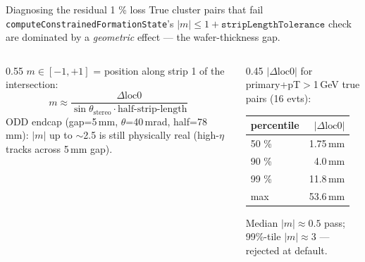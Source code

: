 \documentclass[aspectratio=169,10pt]{beamer}
\begin{document}
\begin{frame}{Diagnosing the residual 1 \% loss}
\footnotesize
True cluster pairs that fail \texttt{computeConstrainedFormationState}'s $|m|\!\le\!1+\mathtt{stripLengthTolerance}$ check are dominated by a \emph{geometric} effect — the wafer-thickness gap.

\begin{columns}[T]
\begin{column}{0.55\textwidth}
$m \in [-1,+1]$ = position along strip 1 of the intersection:
\[
m \approx \frac{\Delta\text{loc0}}{\sin\theta_\mathrm{stereo}\cdot\text{half-strip-length}}
\]
ODD endcap (gap=5\,mm, $\theta$=40\,mrad, half=78\,mm): $|m|$ up to $\sim$2.5 is still physically real (high-$\eta$ tracks across 5\,mm gap).
\end{column}
\begin{column}{0.45\textwidth}
$|\Delta\mathrm{loc0}|$ for primary+pT$>$1\,GeV true pairs (16 evts):

\begin{tabular}{lr}
\toprule
percentile & $|\Delta\mathrm{loc0}|$ \\
\midrule
50 \% & 1.75\,mm \\
90 \% & 4.0\,mm \\
99 \% & 11.8\,mm \\
max   & 53.6\,mm \\
\bottomrule
\end{tabular}

Median $|m|\!\approx\!0.5$ pass; 99\%-tile $|m|\!\approx\!3$ — \alert{rejected at default}.
\end{column}
\end{columns}
\end{frame}
\end{document}
